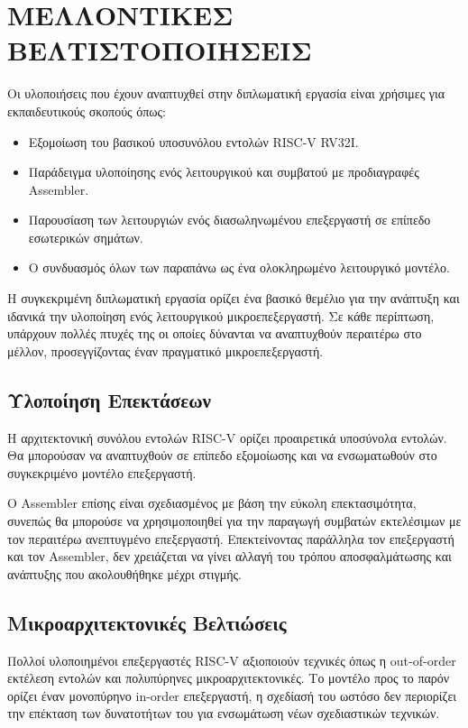 \documentclass[11pt]{extarticle}
\let\stdsection\section
\renewcommand\section{\newpage\stdsection}
\begin{document}
\section{ΜΕΛΛΟΝΤΙΚΕΣ ΒΕΛΤΙΣΤΟΠΟΙΗΣΕΙΣ}

Οι υλοποιήσεις που έχουν αναπτυχθεί στην διπλωματική εργασία είναι χρήσιμες για εκπαιδευτικούς σκοπούς όπως: 
\begin{itemize}
    \item Εξομοίωση του βασικού υποσυνόλου εντολών RISC-V RV32I.
    \item Παράδειγμα υλοποίησης ενός λειτουργικού και συμβατού με προδιαγραφές Assembler.
    \item Παρουσίαση των λειτουργιών ενός διασωληνωμένου επεξεργαστή σε επίπεδο εσωτερικών σημάτων.
    \item Ο συνδυασμός όλων των παραπάνω ως ένα ολοκληρωμένο λειτουργικό μοντέλο.
\end{itemize}

Η συγκεκριμένη διπλωματική εργασία ορίζει ένα βασικό θεμέλιο για την ανάπτυξη και ιδανικά την υλοποίηση ενός λειτουργικού μικροεπεξεργαστή.
Σε κάθε περίπτωση, υπάρχουν πολλές πτυχές της οι οποίες δύνανται να αναπτυχθούν περαιτέρω στο μέλλον, προσεγγίζοντας έναν πραγματικό μικροεπεξεργαστή.

\subsection{Υλοποίηση Επεκτάσεων}
Η αρχιτεκτονική συνόλου εντολών RISC-V ορίζει προαιρετικά υποσύνολα εντολών.
Θα μπορούσαν να αναπτυχθούν σε επίπεδο εξομοίωσης και να ενσωματωθούν στο συγκεκριμένο μοντέλο επεξεργαστή.

Ο Assembler επίσης είναι σχεδιασμένος με βάση την εύκολη επεκτασιμότητα, συνεπώς θα μπορούσε να χρησιμοποιηθεί για την παραγωγή συμβατών εκτελέσιμων με τον περαιτέρω ανεπτυγμένο επεξεργαστή.
Επεκτείνοντας παράλληλα τον επεξεργαστή και τον Assembler, δεν χρειάζεται να γίνει αλλαγή του τρόπου αποσφαλμάτωσης και ανάπτυξης που ακολουθήθηκε μέχρι στιγμής.

\subsection{Μικροαρχιτεκτονικές Βελτιώσεις}
Πολλοί υλοποιημένοι επεξεργαστές RISC-V αξιοποιούν τεχνικές όπως η out-of-order εκτέλεση εντολών και πολυπύρηνες μικροαρχιτεκτονικές.
Το μοντέλο προς το παρόν ορίζει έναν μονοπύρηνο in-order επεξεργαστή, η σχεδίασή του ωστόσο δεν περιορίζει την επέκταση των δυνατοτήτων του για ενσωμάτωση νέων σχεδιαστικών τεχνικών.
\end{document}
